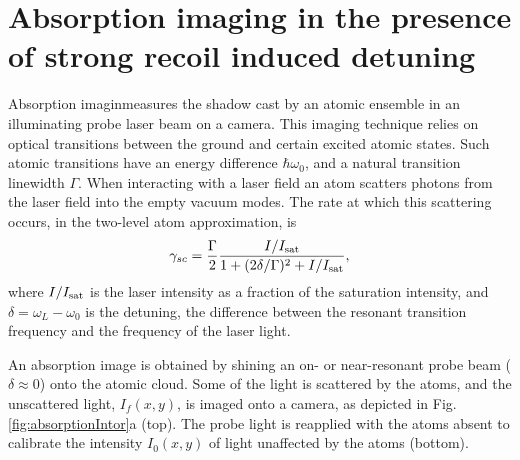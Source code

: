 \documentclass[12pt]{iopart}
\begin{document}
\section{Absorption imaging in the presence of strong recoil induced detuning}
Absorption imaginmeasures the shadow cast by an atomic ensemble in an illuminating probe laser beam on a camera. This imaging technique relies on optical transitions between the ground and certain excited atomic states. Such atomic transitions have an energy difference $\hbar\omega_0$, and a natural transition linewidth $\Gamma$. When interacting with a laser field an atom scatters photons from the laser field into the empty vacuum modes. The  rate at which this scattering occurs, in the two-level atom approximation, is \cite{LCT}
\begin{equation}
\gamma_{sc}= \frac{\Gamma}{2} \frac{I/I_{\rm{sat}}}{1+(2\delta/\Gamma)^2 +I/I_{\rm{sat}}}, 
\label{eq:scatrate}
\end{equation}
where $I/I_{\rm{sat}}$ is the laser intensity as a fraction of the saturation intensity, and $\delta=\omega_L-\omega_0$ is the detuning, the difference between the resonant transition frequency and the frequency of the laser light.  
\par An absorption image is obtained by shining an on- or near-resonant probe beam ($\delta\approx0$) onto the atomic cloud. Some of the light is scattered by the atoms, and the unscattered light, $I_f(x,y)$, is imaged onto a camera, as depicted in Fig. \ref{fig:absorptionIntor}a (top). The probe light is reapplied with the atoms absent to calibrate the intensity $I_0(x,y)$ of light unaffected by the atoms (bottom). 
\end{document}
